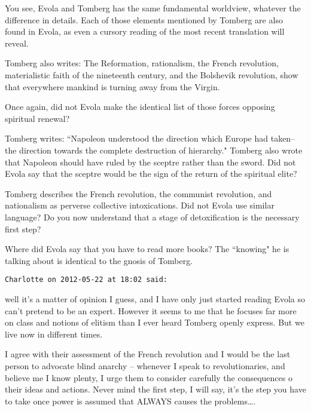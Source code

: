 \begin{footnotesize}
\begin{sffamily}
You see, Evola and Tomberg has the same fundamental worldview, whatever the difference in details. Each of those elements mentioned by Tomberg are also found in Evola, as even a cursory reading of the most recent translation will reveal.

Tomberg also writes: The Reformation, rationalism, the French revolution, materialistic faith of the nineteenth century, and the Bolshevik revolution, show that everywhere mankind is turning away from the Virgin.

Once again, did not Evola make the identical list of those forces opposing spiritual renewal?

Tomberg writes: ``Napoleon understood the direction which Europe had taken–the direction towards the complete destruction of hierarchy." Tomberg also wrote that Napoleon should have ruled by the sceptre rather than the sword. Did not Evola say that the sceptre would be the sign of the return of the spiritual elite?

Tomberg describes the French revolution, the communist revolution, and nationalism as perverse collective intoxications. Did not Evola use similar language? Do you now understand that a stage of detoxification is the necessary first step?

Where did Evola say that you have to read more books? The ``knowing" he is talking about is identical to the gnosis of Tomberg.


\hfill

\texttt{Charlotte on 2012-05-22 at 18:02 said: }

well it's a matter of opinion I guess, and I have only just started reading Evola so can't pretend to be an expert. However it seems to me that he focuses far more on class and notions of elitism than I ever heard Tomberg openly express. But we live now in different times.

I agree with their assessment of the French revolution and I would be the last person to advocate blind anarchy – whenever I speak to revolutionaries, and believe me I know plenty, I urge them to consider carefully the consequences o their ideas and actions. Never mind the first step, I will say, it's the step you have to take once power is assumed that ALWAYS causes the problems…. 


\end{sffamily}
\end{footnotesize}
